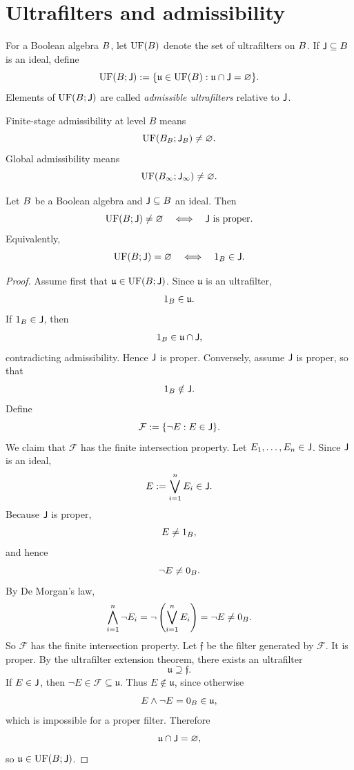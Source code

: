 \section{Ultrafilters and admissibility}
\begin{definition}
	For a Boolean algebra \(B\), let \(\operatorname{UF}(B)\) denote the set of
	ultrafilters on \(B\). If \(\mathsf J\subseteq B\) is an ideal, define
	\[
		\operatorname{UF}(B;\mathsf J)
		:=
		\{\mathfrak u\in\operatorname{UF}(B):\mathfrak u\cap\mathsf J=\varnothing\}.
	\]
	Elements of \(\operatorname{UF}(B;\mathsf J)\) are called \emph{admissible ultrafilters}
	relative to \(\mathsf J\).
\end{definition}
\begin{definition}
	Finite-stage admissibility at level \(B\) means
	\[
		\operatorname{UF}(B_B;\mathsf J_B)\neq\varnothing.
	\]
	Global admissibility means
	\[
		\operatorname{UF}(B_\infty;\mathsf J_\infty)\neq\varnothing.
	\]
\end{definition}
\begin{lemma}
	\label{lem:ideal-sep}
	Let \(B\) be a Boolean algebra and \(\mathsf J\subseteq B\) an ideal. Then
	\[
		\operatorname{UF}(B;\mathsf J)\neq\varnothing
		\quad\Longleftrightarrow\quad
		\mathsf J\text{ is proper}.
	\]
	Equivalently,
	\[
		\operatorname{UF}(B;\mathsf J)=\varnothing
		\quad\Longleftrightarrow\quad
		1_B\in\mathsf J.
	\]
\end{lemma}
\begin{proof}
	Assume first that \(\mathfrak u\in\operatorname{UF}(B;\mathsf J)\). Since \(\mathfrak u\) is
	an ultrafilter,
	\[
		1_B\in\mathfrak u.
	\]
	If \(1_B\in\mathsf J\), then
	\[
		1_B\in\mathfrak u\cap\mathsf J,
	\]
	contradicting admissibility. Hence \(\mathsf J\) is proper.
	Conversely, assume \(\mathsf J\) is proper, so that
	\[
		1_B\notin\mathsf J.
	\]
	Define
	\[
		\mathcal F:=\{\neg E:E\in\mathsf J\}.
	\]
	We claim that \(\mathcal F\) has the finite intersection property. Let
	\(E_1,\dots,E_n\in\mathsf J\). Since \(\mathsf J\) is an ideal,
	\[
		E:=\bigvee_{i=1}^n E_i\in\mathsf J.
	\]
	Because \(\mathsf J\) is proper,
	\[
		E\neq 1_B,
	\]
	and hence
	\[
		\neg E\neq 0_B.
	\]
	By De Morgan's law,
	\[
		\bigwedge_{i=1}^n \neg E_i
		=
		\neg\left(\bigvee_{i=1}^n E_i\right)
		=
		\neg E
		\neq 0_B.
	\]
	So \(\mathcal F\) has the finite intersection property.
	Let \(\mathfrak f\) be the filter generated by \(\mathcal F\). It is
	proper. By the ultrafilter extension theorem, there exists an ultrafilter
	\[
		\mathfrak u\supseteq\mathfrak f.
	\]
	If \(E\in\mathsf J\), then \(\neg E\in\mathcal F\subseteq\mathfrak u\). Thus
	\(E\notin\mathfrak u\), since otherwise
	\[
		E\wedge\neg E=0_B\in\mathfrak u,
	\]
	which is impossible for a proper filter. Therefore
	\[
		\mathfrak u\cap\mathsf J=\varnothing,
	\]
	so \(\mathfrak u\in\operatorname{UF}(B;\mathsf J)\).
\end{proof}
